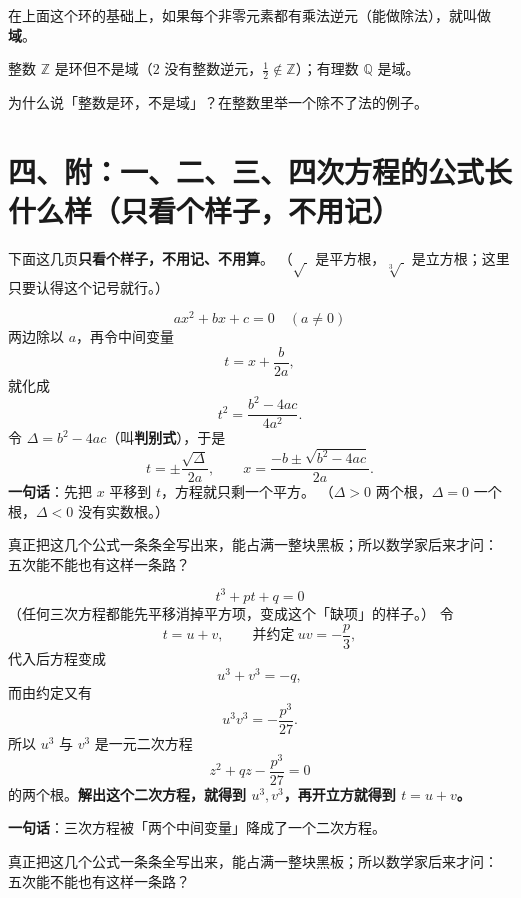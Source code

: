 \begin{definition}[域]
  在上面这个环的基础上，如果每个非零元素都有乘法逆元（能做除法），就叫做\textbf{域}。
\end{definition}

\begin{example}
  整数 \(\mathbb{Z}\) 是环但不是域（\(2\) 没有整数逆元，\(\tfrac12\notin\mathbb{Z}\)）；有理数 \(\mathbb{Q}\) 是域。
\end{example}

\begin{sikao}
  为什么说「整数是环，不是域」？在整数里举一个除不了法的例子。
\end{sikao}

\section*{四、附：一、二、三、四次方程的公式长什么样（只看个样子，不用记）}

\noindent 下面这几页\textbf{只看个样子，不用记、不用算}。
（\(\sqrt{\ }\) 是平方根，\(\sqrt[3]{\ }\) 是立方根；这里只要认得这个记号就行。）

\begin{example}
  \[ ax^2+bx+c=0\quad(a\neq0) \]
  两边除以 \(a\)，再令中间变量
  \[ t=x+\frac{b}{2a}, \]
  就化成
  \[ t^2=\frac{b^2-4ac}{4a^2}. \]
  令 \(\Delta=b^2-4ac\)（叫\textbf{判别式}），于是
  \[ t=\pm\frac{\sqrt{\Delta}}{2a},\qquad x=\frac{-b\pm\sqrt{b^2-4ac}}{2a}. \]
  \textbf{一句话}：先把 \(x\) 平移到 \(t\)，方程就只剩一个平方。
  （\(\Delta>0\) 两个根，\(\Delta=0\) 一个根，\(\Delta<0\) 没有实数根。）

  真正把这几个公式一条条全写出来，能占满一整块黑板；所以数学家后来才问：
  五次能不能也有这样一条路？
\end{example}

\begin{example}[一元三次方程：卡尔达诺设 \(t=u+v\)]
  \[ t^3+pt+q=0 \]
  （任何三次方程都能先平移消掉平方项，变成这个「缺项」的样子。）
  令
  \[ t=u+v,\qquad\text{并约定}\ uv=-\frac{p}{3}, \]
  代入后方程变成
  \[ u^3+v^3=-q, \]
  而由约定又有
  \[ u^3v^3=-\frac{p^3}{27}. \]
  所以 \(u^3\) 与 \(v^3\) 是一元二次方程
  \[ z^2+qz-\frac{p^3}{27}=0 \]
  的两个根。\textbf{解出这个二次方程，就得到 \(u^3,v^3\)，再开立方就得到 \(t=u+v\)。}

  \textbf{一句话}：三次方程被「两个中间变量」降成了一个二次方程。

  真正把这几个公式一条条全写出来，能占满一整块黑板；所以数学家后来才问：
  五次能不能也有这样一条路？
\end{example}

